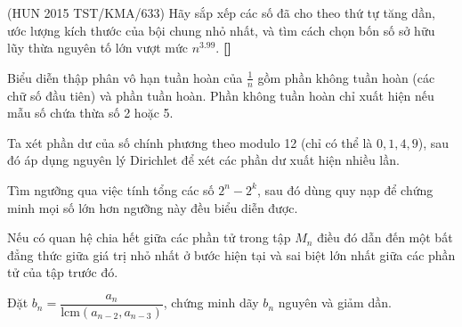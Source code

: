 \documentclass[./m.tex]{subfiles}
\begin{document}
\vspace{1em}

\begin{hint*}(\gls{HUN 2015 TST}/KMA/633)
    Hãy sắp xếp các số đã cho theo thứ tự tăng dần, ước lượng kích thước của bội chung nhỏ nhất,
    và tìm cách chọn bốn số sở hữu lũy thừa nguyên tố lớn vượt mức \( n^{3.99} \).
	\textbf{[]}
\end{hint*}

\vspace{1em}

\begin{hint*}
	Biểu diễn thập phân vô hạn tuần hoàn của \( \frac{1}{n} \) gồm phần không tuần hoàn (các chữ số đầu tiên) và phần tuần hoàn.
	Phần không tuần hoàn chỉ xuất hiện nếu mẫu số chứa thừa số 2 hoặc 5.
\end{hint*}

\vspace{1em}

\begin{hint*}
	Ta xét phần dư của số chính phương theo modulo 12 (chỉ có thể là \( 0, 1, 4, 9 \)),
	sau đó áp dụng nguyên lý Dirichlet để xét các phần dư xuất hiện nhiều lần.  
\end{hint*}

\vspace{1em}

\begin{hint*}
	Tìm ngưỡng qua việc tính tổng các số \( 2^n - 2^k \), sau đó
	dùng quy nạp để chứng minh mọi số lớn hơn ngưỡng này đều biểu diễn được.
\end{hint*}

\vspace{1em}

\begin{hint*}
	Nếu có quan hệ chia hết giữa các phần tử trong tập \( M_n \) điều đó dẫn đến một bất đẳng thức giữa giá trị nhỏ nhất ở bước hiện tại
	và sai biệt lớn nhất giữa các phần tử của tập trước đó.
\end{hint*}

\vspace{1em}

\begin{hint*}
	Đặt \( b_n = \dfrac{a_n}{\text{lcm}(a_{n-2}, a_{n-3})} \), chứng minh dãy \( b_n \) nguyên và giảm dần.
\end{hint*}
\end{document}
